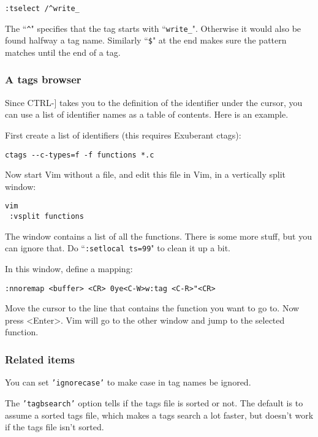 \begin{Verbatim}[samepage=true]
 :tselect /^write_
\end{Verbatim}

The ``\texttt{\^{}}" specifies that the tag starts with ``\texttt{write\_}".
Otherwise it would also be found halfway a tag name.
Similarly ``\texttt{\$}" at the end makes sure the pattern matches until the end of a tag.
\subsubsection{A tags browser}
Since CTRL-] takes you to the definition of the identifier under the cursor, you can use a list of identifier names as a table of contents.
Here is an example.

First create a list of identifiers (this requires Exuberant ctags):

\begin{Verbatim}[samepage=true]
 ctags --c-types=f -f functions *.c
\end{Verbatim}

Now start Vim without a file, and edit this file in Vim, in a vertically split window:

\begin{Verbatim}[samepage=true]
 vim
 :vsplit functions
\end{Verbatim}

The window contains a list of all the functions.
There is some more stuff, but you can ignore that.
Do ``\texttt{:setlocal ts=99}" to clean it up a bit.

In this window, define a mapping:

\begin{Verbatim}[samepage=true]
 :nnoremap <buffer> <CR> 0ye<C-W>w:tag <C-R>"<CR>
\end{Verbatim}

Move the cursor to the line that contains the function you want to go to.
Now press <Enter>.
Vim will go to the other window and jump to the selected function.
\subsubsection{Related items}
You can set \texttt{'ignorecase'} to make case in tag names be ignored.

The \texttt{'tagbsearch'} option tells if the tags file is sorted or not.
The default is to assume a sorted tags file, which makes a tags search a lot faster, but doesn't work if the tags file isn't sorted.

